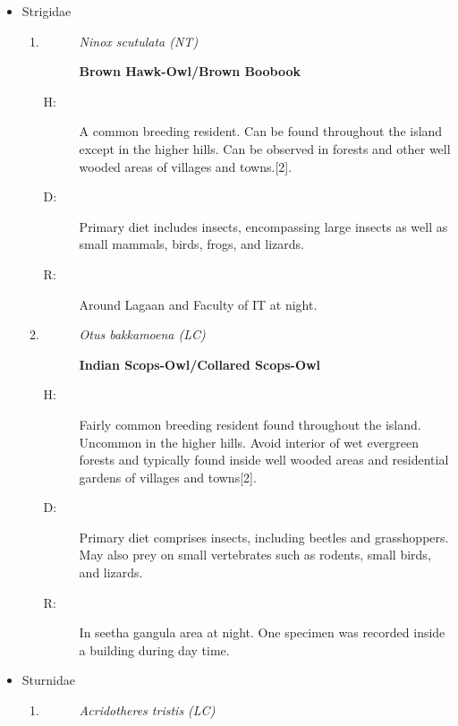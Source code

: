 \begin{itemize}
\begin{enumerate}
\end{enumerate}%
\item%
Strigidae%
\begin{enumerate}%
\item%
\begin{description}%
\item[]%
\textit{Ninox scutulata (NT)}%
\item[]%
\textbf{Brown Hawk{-}Owl/Brown Boobook}%
\end{description}%
\begin{description}%
\item[H: ]%
A common breeding resident. Can be found throughout the island except in the higher hills. Can be observed in forests and other well wooded areas of villages and towns.{[}2{]}.%
\item[D: ]%
Primary diet includes insects, encompassing large insects as well as small mammals, birds, frogs, and lizards.%
\item[R: ]%
Around Lagaan and Faculty of IT at night.%
\end{description}%
\item%
\begin{description}%
\item[]%
\textit{Otus bakkamoena (LC)}%
\item[]%
\textbf{Indian Scops{-}Owl/Collared Scops{-}Owl}%
\end{description}%
\begin{description}%
\item[H: ]%
Fairly common breeding resident found throughout the island. Uncommon in the higher hills. Avoid interior of wet evergreen forests and typically found inside well wooded areas and residential gardens of villages and towns{[}2{]}.%
\item[D: ]%
Primary diet comprises insects, including beetles and grasshoppers. May also prey on small vertebrates such as rodents, small birds, and lizards.%
\item[R: ]%
In seetha gangula area at night. One specimen was recorded inside a building during day time.%
\end{description}%
\end{enumerate}%
\item%
Sturnidae%
\begin{enumerate}%
\item%
\begin{description}%
\item[]%
\textit{Acridotheres tristis (LC)}%
\item[]%

\end{description}
\end{enumerate}
\end{itemize}
